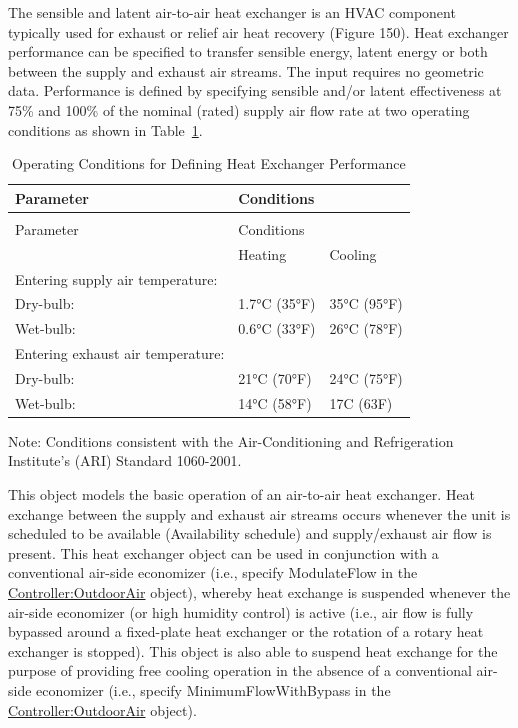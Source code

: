 The sensible and latent air-to-air heat exchanger is an HVAC component typically used for exhaust or relief air heat recovery (Figure 150). Heat exchanger performance can be specified to transfer sensible energy, latent energy or both between the supply and exhaust air streams. The input requires no geometric data. Performance is defined by specifying sensible and/or latent effectiveness at 75\% and 100\% of the nominal (rated) supply air flow rate at two operating conditions as shown in Table~\ref{table:operating-conditions-for-defining-heat}.

\begin{longtable}[c]{@{}lll@{}}
\caption{Operating Conditions for Defining Heat Exchanger Performance \label{table:operating-conditions-for-defining-heat}} \tabularnewline
\toprule
Parameter & Conditions & \tabularnewline
\midrule
\endfirsthead

\caption[]{Operating Conditions for Defining Heat Exchanger Performance} \tabularnewline
\toprule
Parameter & Conditions & \tabularnewline
\midrule
\endhead

& Heating & Cooling \tabularnewline
Entering supply air temperature: &  &  \tabularnewline
Dry-bulb: & 1.7°C (35°F) & 35°C (95°F) \tabularnewline
Wet-bulb: & 0.6°C (33°F) & 26°C (78°F) \tabularnewline
Entering exhaust air temperature: &  &  \tabularnewline
Dry-bulb: & 21°C (70°F) & 24°C (75°F) \tabularnewline
Wet-bulb: & 14°C (58°F) & 17C (63F) \tabularnewline
\bottomrule
\end{longtable}

Note: Conditions consistent with the Air-Conditioning and Refrigeration Institute's (ARI) Standard 1060-2001.

This object models the basic operation of an air-to-air heat exchanger. Heat exchange between the supply and exhaust air streams occurs whenever the unit is scheduled to be available (Availability schedule) and supply/exhaust air flow is present. This heat exchanger object can be used in conjunction with a conventional air-side economizer (i.e., specify ModulateFlow in the \hyperref[controlleroutdoorair]{Controller:OutdoorAir} object), whereby heat exchange is suspended whenever the air-side economizer (or high humidity control) is active (i.e., air flow is fully bypassed around a fixed-plate heat exchanger or the rotation of a rotary heat exchanger is stopped). This object is also able to suspend heat exchange for the purpose of providing free cooling operation in the absence of a conventional air-side economizer (i.e., specify MinimumFlowWithBypass in the \hyperref[controlleroutdoorair]{Controller:OutdoorAir} object).


